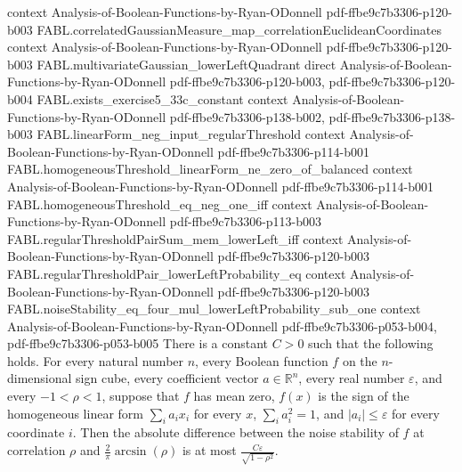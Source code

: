 \begin{theorem}
  {context}
  {Analysis-of-Boolean-Functions-by-Ryan-ODonnell}
  {pdf-ffbe9c7b3306-p120-b003}
\proofstep
  {FABL.correlatedGaussianMeasure_map_correlationEuclideanCoordinates}
  {context}
  {Analysis-of-Boolean-Functions-by-Ryan-ODonnell}
  {pdf-ffbe9c7b3306-p120-b003}
\proofstep
  {FABL.multivariateGaussian_lowerLeftQuadrant}
  {direct}
  {Analysis-of-Boolean-Functions-by-Ryan-ODonnell}
  {pdf-ffbe9c7b3306-p120-b003,
    pdf-ffbe9c7b3306-p120-b004}
\proofstep
  {FABL.exists_exercise5_33c_constant}
  {context}
  {Analysis-of-Boolean-Functions-by-Ryan-ODonnell}
  {pdf-ffbe9c7b3306-p138-b002,
    pdf-ffbe9c7b3306-p138-b003}
\proofstep
  {FABL.linearForm_neg_input_regularThreshold}
  {context}
  {Analysis-of-Boolean-Functions-by-Ryan-ODonnell}
  {pdf-ffbe9c7b3306-p114-b001}
\proofstep
  {FABL.homogeneousThreshold_linearForm_ne_zero_of_balanced}
  {context}
  {Analysis-of-Boolean-Functions-by-Ryan-ODonnell}
  {pdf-ffbe9c7b3306-p114-b001}
\proofstep
  {FABL.homogeneousThreshold_eq_neg_one_iff}
  {context}
  {Analysis-of-Boolean-Functions-by-Ryan-ODonnell}
  {pdf-ffbe9c7b3306-p113-b003}
\proofstep
  {FABL.regularThresholdPairSum_mem_lowerLeft_iff}
  {context}
  {Analysis-of-Boolean-Functions-by-Ryan-ODonnell}
  {pdf-ffbe9c7b3306-p120-b003}
\proofstep
  {FABL.regularThresholdPair_lowerLeftProbability_eq}
  {context}
  {Analysis-of-Boolean-Functions-by-Ryan-ODonnell}
  {pdf-ffbe9c7b3306-p120-b003}
\proofstep
  {FABL.noiseStability_eq_four_mul_lowerLeftProbability_sub_one}
  {context}
  {Analysis-of-Boolean-Functions-by-Ryan-ODonnell}
  {pdf-ffbe9c7b3306-p053-b004,
    pdf-ffbe9c7b3306-p053-b005}
There is a constant $C>0$ such that the following holds. For every natural number $n$,
every Boolean function $f$ on the $n$-dimensional sign cube, every coefficient vector
$a\in\mathbb{R}^n$, every real number $\varepsilon$, and every $-1<\rho<1$, suppose that
$f$ has mean zero, $f(x)$ is the sign of the homogeneous linear form $\sum_i a_i x_i$
for every $x$, $\sum_i a_i^2=1$, and $|a_i|\le\varepsilon$ for every coordinate $i$.
Then the absolute difference between the noise stability of $f$ at correlation $\rho$
and $\frac{2}{\pi}\arcsin(\rho)$ is at most $\frac{C\varepsilon}{\sqrt{1-\rho^2}}$.
\end{theorem}
